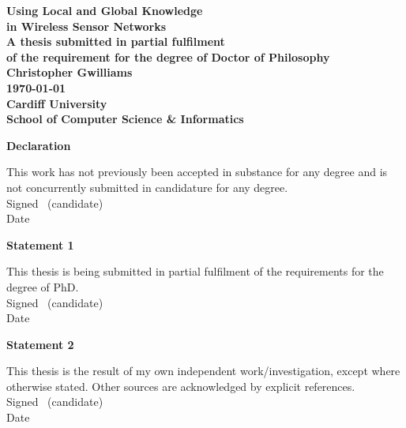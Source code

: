 \documentclass[a4paper,oneside,onecolumn,openright,12pt]{book}
\begin{document}
\frontmatter


\begin{titlepage}

\begin{center}
\vspace*{3ex}
\textbf{\Huge Using Local and Global Knowledge}\\[2ex]
\textbf{\Huge in Wireless Sensor Networks}\\[12ex]
\textbf{\large A thesis submitted in partial fulfilment}\\[1ex]
\textbf{\large of the requirement for the degree of Doctor of
  Philosophy}\\[16ex]
\textbf{\LARGE Christopher Gwilliams}\\
\vfill
\textbf{\LARGE \today}\\
\vfill
\textbf{\LARGE Cardiff University}\\[1ex]
\textbf{\LARGE School of Computer Science \& Informatics}\\[4ex]
\end{center}

\end{titlepage}
\newpage\thispagestyle{empty}\cleardoublepage


\thispagestyle{plain}

\vspace*{6ex}

\textbf{\large Declaration}

This work has not previously been accepted in substance for any degree and is not concurrently submitted in candidature for any degree.\\[2ex]
Signed \dotfill \ (candidate) \hspace*{10em}\\[1ex]
Date\ \ \ \ \ \dotfill \hspace*{18em}

\vfill

\textbf{\large Statement 1}

This thesis is being submitted in partial fulfilment of the requirements for the degree of PhD.\\[2ex]
Signed \dotfill \ (candidate) \hspace*{10em}\\[1ex]
Date\ \ \ \ \ \dotfill \hspace*{18em}

\textbf{\large Statement 2}

This thesis is the result of my own independent work/investigation,
except where otherwise stated. Other sources are acknowledged by
explicit references.\\[2ex]
Signed \dotfill \ (candidate) \hspace*{10em}\\[1ex]
Date\ \ \ \ \ \dotfill \hspace*{18em}
\end{document}
